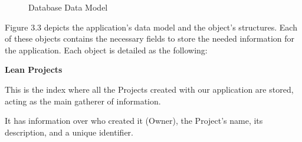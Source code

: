 \documentclass[a4paper,twoside,10pt]{report}
\begin{document}
\begin{figure}[h!]
  \center
  \caption{Database Data Model}
\end{figure}

Figure 3.3 depicts the application's data model and the object's structures. Each of these objects contains the necessary fields to store the needed information for the application. 
\newpage
Each object is detailed as the following:
\newline

\textbf{Lean Projects}

This is the index where all the Projects created with our application are stored, acting as the main gatherer of information.

It has information over who created it (Owner), the Project's name, its description, and a unique identifier.
\end{document}
